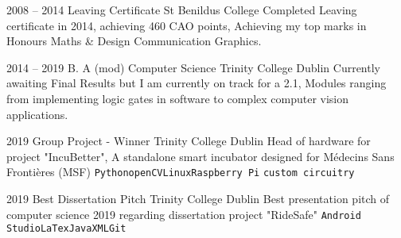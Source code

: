 \documentclass[9pt]{developercv} %
\begin{document}


\begin{entrylist}
	\entry
		{2008 -- 2014}
		{Leaving Certificate}
		{St Benildus College}
		{Completed Leaving certificate in 2014, achieving 460 CAO points, Achieving my top marks in Honours Maths \& Design Communication Graphics.}

	\entry
		{2014 -- 2019}
		{B. A (mod) Computer Science}
		{Trinity College Dublin}
		{Currently awaiting Final Results but I am currently on track for a 2.1, Modules ranging from implementing logic gates in software to complex computer vision applications.}
	
\end{entrylist}








\begin{entrylist}
	\entry
		{2019}
		{Group Project - Winner}
		{Trinity College Dublin}
		{Head of hardware for project "IncuBetter", A standalone smart incubator designed for Médecins Sans Frontières (MSF)   \texttt{Python}\slashsep\texttt{openCV}\slashsep\texttt{Linux}\slashsep\texttt{Raspberry Pi} \slashsep\texttt{custom circuitry}}


	\entry
		{2019}
		{Best Dissertation Pitch}
		{Trinity College Dublin}
		{Best presentation pitch of computer science 2019 regarding dissertation project "RideSafe"  \texttt{Android Studio}\slashsep\texttt{LaTex}\slashsep\texttt{Java}\slashsep\texttt{XML}\slashsep\texttt{Git}}
	
\end{entrylist}



\end{document}
